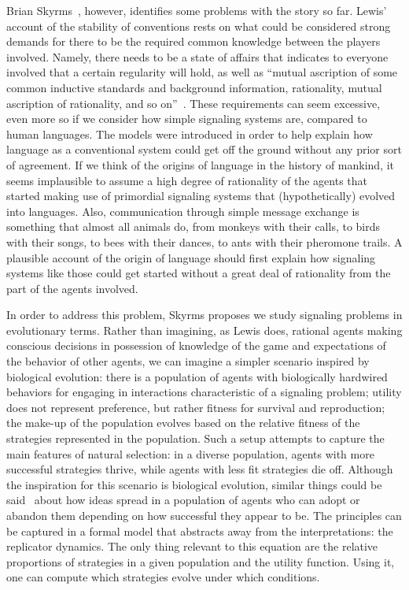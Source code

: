 \documentclass[a4paper]{article}
\begin{document}
Brian Skyrms~\parencite*[80--104]{skyrms_evolution_1996}, however, identifies some problems with the story so far.
Lewis' account of the stability of conventions rests on what could be considered strong demands for there to be the required common knowledge between the players involved.
Namely, there needs to be a state of affairs that indicates to everyone involved that a certain regularity will hold, as well as ``mutual ascription of some common inductive standards and background information, rationality, mutual ascription of rationality, and so on''~\parencite*[56--57]{lewis_convention_1969}.
These requirements can seem excessive, even more so if we consider how simple signaling systems are, compared to human languages.
The models were introduced in order to help explain how language as a conventional system could get off the ground without any prior sort of agreement.
If we think of the origins of language in the history of mankind, it seems implausible to assume a high degree of rationality of the agents that started making use of primordial signaling systems that (hypothetically) evolved into languages.
Also, communication through simple message exchange is something that almost all animals do, from monkeys with their calls, to birds with their songs, to bees with their dances, to ants with their pheromone trails.
A plausible account of the origin of language should first explain how signaling systems like those could get started without a great deal of rationality from the part of the agents involved.

In order to address this problem, Skyrms proposes we study signaling problems in evolutionary terms.
Rather than imagining, as Lewis does, rational agents making conscious decisions in possession of knowledge of the game and expectations of the behavior of other agents, we can imagine a simpler scenario inspired by biological evolution: there is a population of agents with biologically hardwired behaviors for engaging in interactions characteristic of a signaling problem; utility does not represent preference, but rather fitness for survival and reproduction; the make-up of the population evolves based on the relative fitness of the strategies represented in the population.
Such a setup attempts to capture the main features of natural selection: in a diverse population, agents with more successful strategies thrive, while agents with less fit strategies die off.
Although the inspiration for this scenario is biological evolution, similar things could be said~\parencite[\emph{e.g.}][]{dawkins_selfish_1978,boyd_culture_1985} about how ideas spread in a population of agents who can adopt or abandon them depending on how successful they appear to be.
The principles can be captured in a formal model that abstracts away from the interpretations: the replicator dynamics.
The only thing relevant to this equation are the relative proportions of strategies in a given population and the utility function.
Using it, one can compute which strategies evolve under which conditions.
\end{document}
